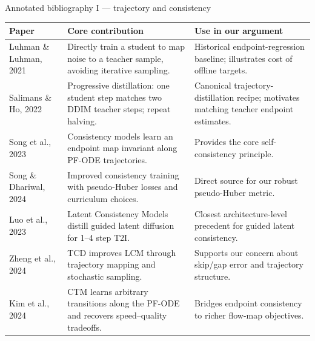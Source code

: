 \documentclass[aspectratio=169,10pt]{beamer}
\begin{document}
\begin{frame}[shrink=6]{Annotated bibliography I --- trajectory and consistency}
  \scriptsize
  \begin{adjustbox}{max width=\textwidth, max height=0.80\textheight, center}
  \begin{tabular}{@{}L{0.22\textwidth}L{0.34\textwidth}L{0.34\textwidth}@{}}
    \toprule
    \textbf{Paper} & \textbf{Core contribution} & \textbf{Use in our argument} \\
    \midrule
    Luhman \& Luhman, 2021 & Directly train a student to map noise to a teacher sample, avoiding iterative sampling. & Historical endpoint-regression baseline; illustrates cost of offline targets. \\
    Salimans \& Ho, 2022 & Progressive distillation: one student step matches two DDIM teacher steps; repeat halving. & Canonical trajectory-distillation recipe; motivates matching teacher endpoint estimates. \\
    Song et al., 2023 & Consistency models learn an endpoint map invariant along PF-ODE trajectories. & Provides the core self-consistency principle. \\
    Song \& Dhariwal, 2024 & Improved consistency training with pseudo-Huber losses and curriculum choices. & Direct source for our robust pseudo-Huber metric. \\
    Luo et al., 2023 & Latent Consistency Models distill guided latent diffusion for 1--4 step T2I. & Closest architecture-level precedent for guided latent consistency. \\
    Zheng et al., 2024 & TCD improves LCM through trajectory mapping and stochastic sampling. & Supports our concern about skip/gap error and trajectory structure. \\
    Kim et al., 2024 & CTM learns arbitrary transitions along the PF-ODE and recovers speed--quality tradeoffs. & Bridges endpoint consistency to richer flow-map objectives. \\
    \bottomrule
  \end{tabular}
  \end{adjustbox}
\end{frame}
\end{document}

